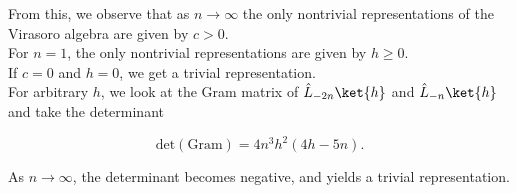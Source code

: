 \noindent From this, we observe that as $n \rightarrow \infty$ the only nontrivial representations of the Virasoro algebra are given by $c>0$. \\

\noindent For $n=1$, the only nontrivial representations are given by $h \ge 0$. \\

\noindent If $c=0$ and $h=0$, we get a trivial representation. \\

\noindent For arbitrary $h$, we look at the Gram matrix of $\hat{L}_{-2n} \ket{h}$ and $\hat{L}_{-n} \ket{h}$ and take the determinant

\begin{equation}
\text{det}(\text{Gram}) = 4n^3 h^2 (4h - 5n).
\end{equation}

\noindent As $n \rightarrow \infty$, the determinant becomes negative, and yields a trivial representation.
